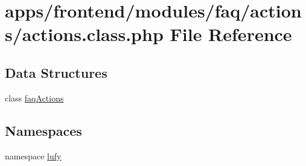 \hypertarget{frontend_2modules_2faq_2actions_2actions_8class_8php}{\section{apps/frontend/modules/faq/actions/actions.class.\-php File Reference}
\label{frontend_2modules_2faq_2actions_2actions_8class_8php}
}
\subsection*{Data Structures}
\begin{DoxyCompactItemize}
\item 
class \hyperlink{classfaq_actions}{faq\-Actions}
\end{DoxyCompactItemize}
\subsection*{Namespaces}
\begin{DoxyCompactItemize}
\item 
namespace \hyperlink{namespacelufy}{lufy}
\end{DoxyCompactItemize}
